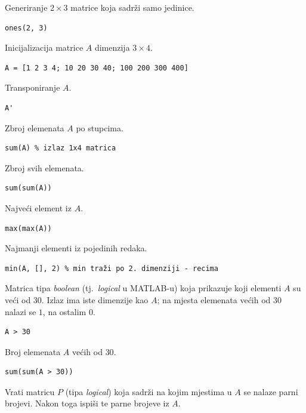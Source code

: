 \documentclass[a4paper, 10pt]{article}
\begin{document}
Generiranje $2 \times 3$ matrice koja sadrži samo jedinice.

\begin{lstlisting}
ones(2, 3)
\end{lstlisting}

Inicijalizacija matrice $A$ dimenzija $3 \times 4$.

\begin{lstlisting}
A = [1 2 3 4; 10 20 30 40; 100 200 300 400]
\end{lstlisting}

Transponiranje $A$.

\begin{lstlisting}
A'
\end{lstlisting}

Zbroj elemenata $A$ po stupcima.

\begin{lstlisting}
sum(A) % izlaz 1x4 matrica
\end{lstlisting}

Zbroj svih elemenata.

\begin{lstlisting}
sum(sum(A))
\end{lstlisting}

Najveći element iz $A$.

\begin{lstlisting}
max(max(A))
\end{lstlisting}

Najmanji elementi iz pojedinih redaka.

\begin{lstlisting}
min(A, [], 2) % min traži po 2. dimenziji - recima
\end{lstlisting}

Matrica tipa \emph{boolean} (tj.\ \emph{logical} u MATLAB-u) koja prikazuje koji elementi $A$ su veći od $30$.
Izlaz ima iste dimenzije kao $A$; na mjesta elemenata većih od $30$ nalazi se $1$, na ostalim $0$.

\begin{lstlisting}
A > 30
\end{lstlisting}

Broj elemenata $A$ većih od $30$.

\begin{lstlisting}
sum(sum(A > 30))
\end{lstlisting}

Vrati matricu $P$ (tipa \emph{logical}) koja sadrži na kojim mjestima u $A$ se nalaze parni brojevi.
Nakon toga ispiši te parne brojeve iz $A$.
\end{document}
